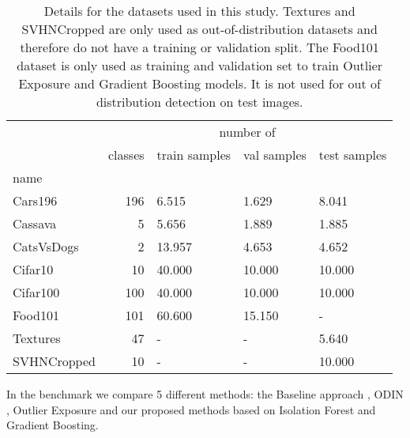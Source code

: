 \documentclass{article}
\begin{document}
\begin{table*}
\centering
\caption{Details for the datasets used in this study. Textures and SVHNCropped are only used as out-of-distribution datasets and therefore do not have a training or validation split. The Food101 dataset is only used as training and validation set to train Outlier Exposure and Gradient Boosting models. It is not used for out of distribution detection on test images.}
\label{detailsDataset}
\begin{tabular}{lrlll}
\toprule
{} & \multicolumn{4}{c}{number of} \\
{} &   classes & train samples & val samples & test samples \\
name        &           &               &             &              \\
\midrule
Cars196     &       196 &          6.515 &        1.629 &         8.041 \\
Cassava     &         5 &          5.656 &        1.889 &         1.885 \\
CatsVsDogs  &         2 &         13.957 &        4.653 &         4.652 \\
Cifar10     &        10 &         40.000 &       10.000 &        10.000 \\
Cifar100    &       100 &         40.000 &       10.000 &        10.000 \\
Food101     &       101 &         60.600 &       15.150 &            - \\
Textures    &        47 &             - &           - &         5.640 \\
SVHNCropped &        10 &             - &           - &        10.000 \\
\bottomrule
\end{tabular}
\end{table*} 
In the benchmark we compare 5 different methods: the Baseline approach \cite{Hendrycks.2016b}, ODIN \cite{Liang.2017}, Outlier Exposure \cite{Hendrycks.2018} and our proposed methods based on Isolation Forest and Gradient Boosting.
\end{document}
